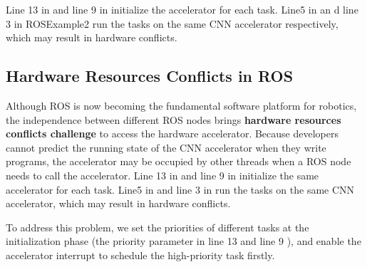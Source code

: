 Line 13 in  and line 9 in  initialize the accelerator for each task. Line5 in  an d line 3 in ROSExample2 run the tasks on the same CNN accelerator respectively, which may result in hardware conflicts. 

\subsection{Hardware Resources Conflicts in ROS}

Although ROS is now becoming the fundamental software platform for robotics, the independence between different ROS nodes brings \textbf{hardware resources conflicts challenge} to access the hardware accelerator. 
Because developers cannot predict the running state of the CNN accelerator when they write programs, the accelerator may be occupied by other threads when a ROS node needs to call the accelerator. Line 13 in  and line 9 in  initialize the same accelerator for each task. Line5 in  and line 3 in  run the tasks on the same CNN accelerator, which may result in hardware conflicts.

To address this problem, we set the priorities of different tasks at the initialization phase (the {\color{red}priority} parameter in   line 13 and  line 9 ), and enable the accelerator interrupt to schedule the high-priority task firstly.



